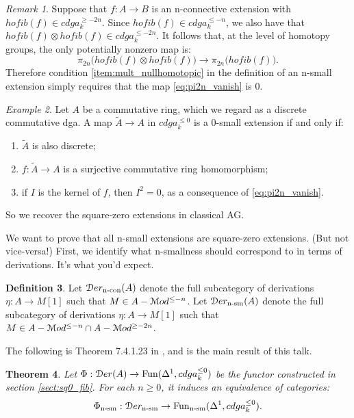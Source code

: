 \documentclass[10pt,a4paper,reqno,oneside]{book} %
\theoremstyle{plain}
\newtheorem{thm}{Theorem}[section]
\theoremstyle{definition}
\newtheorem{defin}[thm]{Definition}
\theoremstyle{remark}
\newtheorem{eg}[thm]{Example}
\newtheorem{rem}[thm]{Remark}
\numberwithin{equation}{section}
\begin{document}
\begin{rem}
Suppose that $f:A \to B$ is an n-connective extension with $hofib(f) \in cdga_k^{\geq -2n}$. Since $hofib(f) \in cdga_k^{\leq -n}$,
we also have that $hofib(f) \otimes hofib(f) \in cdga_k^{\leq -2n}$. It follows that, at the level of homotopy groups,
the only potentially nonzero map is:
\begin{equation}
\label{eq:pi2n_vanish}
	\pi_{2n}\big(hofib(f) \otimes hofib(f)\big) \to \pi_{2n}\big(hofib(f)\big).
\end{equation}
Therefore condition \ref{item:mult_nullhomotopic} in the definition of an n-small extension simply requires that the map
\ref{eq:pi2n_vanish} is 0.
\end{rem}

\begin{eg}
Let $A$ be a commutative ring, which we regard as a discrete commutative dga. A map $\tilde A \to A$ in $cdga_k^{\leq 0}$
is a 0-small extension if and only if:
\begin{enumerate}
\item $\tilde A$ is also discrete;
\item $f: \tilde A \to A$ is a surjective commutative ring homomorphism;
\item if $I$ is the kernel of $f$, then $I^2 = 0$, as a consequence of \ref{eq:pi2n_vanish}.
\end{enumerate}
So we recover the square-zero extensions in classical AG.
\end{eg}

We want to prove that all n-small extensions are square-zero extensions. (But not vice-versa!) First, we identify
what n-smallness should correspond to in terms of derivations. It's what you'd expect.

\begin{defin}
Let $\mathcal D er_{\text{n-con}}(A)$ denote the full subcategory of derivations $\eta : A \to M[1]$ such that $M \in A-\mathcal M od^{\leq -n}$.
Let $\mathcal D er_{\text{n-sm}}(A)$ denote the full subcategory of derivations $\eta : A \to M[1]$ such that 
$M \in A-\mathcal M od^{\leq -n} \cap A-\mathcal M od^{\geq -2n}$.
\end{defin}

The following is Theorem 7.4.1.23 in \cite{Lurie_Higher_algebra}, and is the main result of this talk.

\begin{thm}
Let $\Phi : \mathcal D er(A) \to \operatorname{Fun}(\Delta^1, cdga_k^{\leq 0})$ be the functor constructed in section \ref{sect:sq0_fib}. For
each $n\geq 0$, it induces an equivalence of categories:
\[	\Phi_{\text{n-sm}} : \mathcal D er_{\text{n-sm}} \to \operatorname{Fun}_{\text{n-sm}}(\Delta^1, cdga_k^{\leq 0}).	\]
\end{thm}
\end{document}
